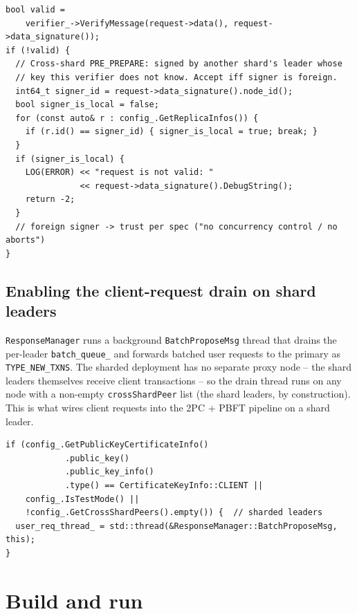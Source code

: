 \documentclass[11pt]{article}
\begin{document}
\begin{lstlisting}[style=cppstyle,caption={\texttt{platform/consensus/ordering/pbft/commitment.cpp} -- accept cross-shard \texttt{PRE\_PREPARE} (foreign signer).}]
bool valid =
    verifier_->VerifyMessage(request->data(), request->data_signature());
if (!valid) {
  // Cross-shard PRE_PREPARE: signed by another shard's leader whose
  // key this verifier does not know. Accept iff signer is foreign.
  int64_t signer_id = request->data_signature().node_id();
  bool signer_is_local = false;
  for (const auto& r : config_.GetReplicaInfos()) {
    if (r.id() == signer_id) { signer_is_local = true; break; }
  }
  if (signer_is_local) {
    LOG(ERROR) << "request is not valid: "
               << request->data_signature().DebugString();
    return -2;
  }
  // foreign signer -> trust per spec ("no concurrency control / no aborts")
}
\end{lstlisting}

\subsection{Enabling the client-request drain on shard leaders}

\texttt{ResponseManager} runs a background \texttt{BatchProposeMsg}
thread that drains the per-leader \texttt{batch\_queue\_} and forwards
batched user requests to the primary as \texttt{TYPE\_NEW\_TXNS}. The
sharded deployment has no separate proxy node -- the shard leaders
themselves receive client transactions -- so the drain thread runs on
any node with a non-empty \texttt{crossShardPeer} list (the shard
leaders, by construction). This is what wires client requests into
the 2PC + PBFT pipeline on a shard leader.

\begin{lstlisting}[style=cppstyle,caption={\texttt{platform/consensus/ordering/pbft/response\_manager.cpp} -- drain thread also runs on sharded leaders.}]
if (config_.GetPublicKeyCertificateInfo()
            .public_key()
            .public_key_info()
            .type() == CertificateKeyInfo::CLIENT ||
    config_.IsTestMode() ||
    !config_.GetCrossShardPeers().empty()) {  // sharded leaders
  user_req_thread_ = std::thread(&ResponseManager::BatchProposeMsg, this);
}
\end{lstlisting}

\section{Build and run}
\end{document}
